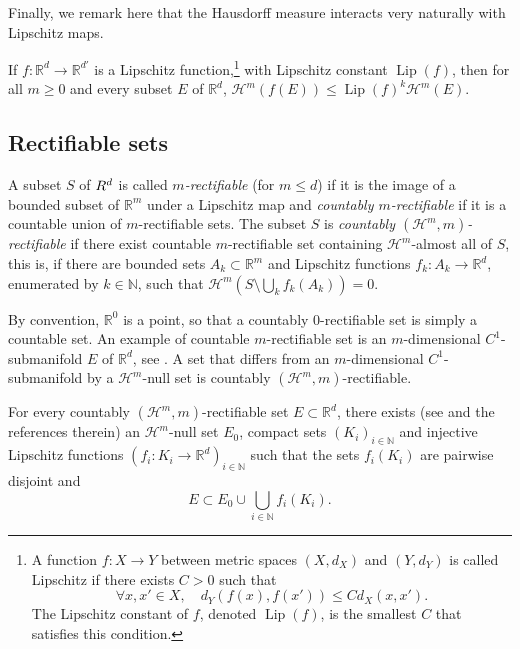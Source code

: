 \documentclass[runningheads]{llncs}
\newcommand{\Rr}{\mathbb{R}}
\newcommand{\Nn}{\mathbb{N}}
\newcommand{\keyt}[1]{\emph{#1}}
\begin{document}
Finally, we remark here that the Hausdorff measure interacts very naturally with Lipschitz maps.

\begin{lemma}\label{lem:inequality_hausdorff_Lipschitz_maps}
If $f:\Rr^d\to \Rr^{d'}$ is a Lipschitz function,\footnote{A function $f:X\to Y$ between metric spaces $(X, d_X)$ and $(Y,d_Y)$ is called Lipschitz if there exists $C>0$ such that
$$\forall x,x'\in X,\quad d_Y(f(x),f(x')) \leq C d_X(x,x').$$
The Lipschitz constant  of $f$, denoted  $\operatorname{Lip}(f)$, is the smallest $C$ that satisfies this condition.
} 
with Lipschitz constant $\operatorname{Lip}(f)$, then for all  $m\geq 0$ and every subset $E$ of $\Rr^d$, $\mathcal H^m(f(E)) \leq \operatorname{Lip}(f)^k \mathcal H^m(E)$.
\end{lemma}


\subsection{Rectifiable sets}

\begin{definition} A subset $S$ of $\mathcal \Rr^d$ is called \emph{$m$-rectifiable} (for $m\leq d$) if it is the image of a bounded subset of $\Rr^m$ under a Lipschitz map and \emph{countably $m$-rectifiable} if it is a countable union of $m$-rectifiable sets.  The subset $S$ is  
 \keyt{countably $(\mathcal H^m,m)$-rectifiable}  if there exist countable $m$-rectifiable set containing $\mathcal H^m$-almost all of $S$, this is, if there are bounded sets $A_k \subset \Rr^m$ and Lipschitz functions $f_k : A_k \to \Rr^d$, enumerated by $k\in \Nn$, such that $\mathcal H^m(S\setminus \bigcup_k f_k(A_k))=0$. 
 \end{definition}
 
 By convention, $\Rr^0$ is a point, so  that a countably $0$-rectifiable set is simply a countable set. An example of countable  $m$-rectifiable set is an $m$-dimensional $C^1$-submanifold $E$ of $\Rr^d$, see  \cite[App. A]{Alberti2019}. A set that differs from an $m$-dimensional $C^1$-submanifold by a  $\mathcal H^m$-null set is countably $(\mathcal H^m,m)$-rectifiable.

 For every countably $(\mathcal H^m,m)$-rectifiable set $E\subset \Rr^d$, there exists (see \cite[pp. 16-17]{Vigneaux-stratified} and the references therein) an $\mathcal H^m$-null set $E_0$, compact sets $(K_i)_{i\in \Nn}$ and injective Lipschitz functions $(f_i:K_i\to \Rr^d)_{i\in \Nn}$ such that the sets $f_i(K_i)$ are pairwise disjoint and
  \begin{equation}\label{eq:representation_rect_compact}
      E\subset E_0 \cup \bigcup_{i\in \Nn} f_i (K_i).
  \end{equation}
\end{document}
